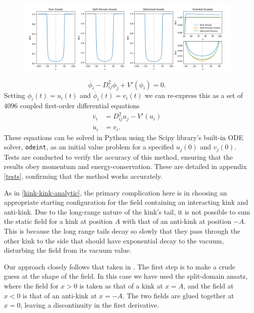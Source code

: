 \documentclass[11pt, oneside]{article}  	%
\numberwithin{equation}{section}
\begin{document}
\begin{figure}
\centering
\includegraphics[width=\textwidth]{field_ansatze.png}
\label{ansatze}
\end{figure}
\begin{equation}
\ddot{\phi_i} - D^2_{ij}\phi_j + V'(\phi_i) = 0.
\end{equation}
Setting $\phi_i(t) = u_i(t)$ and $\dot{\phi_i}(t) = v_i(t)$ we can re-express this as a set of 4096 coupled first-order differential equations
\begin{align}
\dot{v_i} &= D^2_{ij}u_j - V'(u_i) \\
\dot{u_i} &= v_i .
\end{align}
 These equations can be solved in Python using the Scipy library's built-in ODE solver, \texttt{odeint}, as an initial value problem for a specified $u_{j}(0)$ and $v_{j}(0)$. Tests are conducted to verify the accuracy of this method, ensuring that the results obey momentum and energy-conservation. These are detailed in appendix \ref{tests}, confirming that the method works accurately.\par
 As in \textsection \ref{kink-kink-analytic}, the primary complication here is in choosing an appropriate starting configuration for the field containing an interacting kink and anti-kink. Due to the long-range nature of the kink's tail, it is not possible to sum the static field for a kink at position $A$ with that of an anti-kink at position $-A$. This is because the long range tails decay so slowly that they pass through the other kink to the side that should have exponential decay to the vacuum, disturbing the field from its vacuum value.\par
 Our approach closely follows that taken in \cite{christov-num}. The first step is to make a crude guess at the shape of the field. In this case we have used the split-domain ansatz, where the field for $x>0$ is taken as that of a kink at $x=A$, and the field at $x<0$ is that of an anti-kink at $x=-A$. The two fields are glued together at $x=0$, leaving a discontinuity in the first derivative.\par
\end{document}
